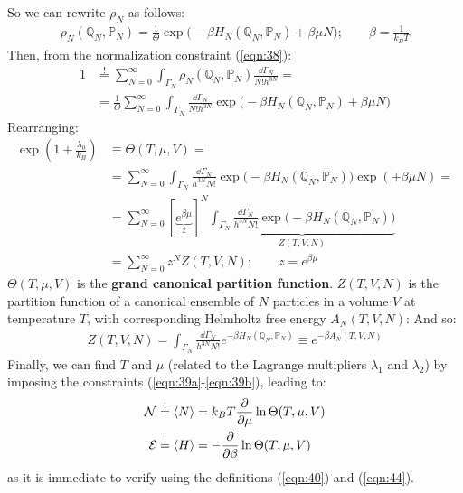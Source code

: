 \documentclass[../template.tex]{subfiles}
\begin{document}
So we can rewrite $\rho_N$ as follows:
\begin{align}\label{eqn:42}
    \rho_N(\mathbb{Q}_N, \mathbb{P}_N) = \frac{1}{\Theta} \exp \Big(-\beta H_N(\mathbb{Q}_N, \mathbb{P}_N) + \beta \mu N \Big); \qquad \beta = \frac{1}{k_B T} 
\end{align}
Then, from the normalization constraint (\ref{eqn:38}):
\begin{align*}
    1 &\overset{!}{=}  \sum_{N=0}^\infty \int_{\Gamma_N} \rho_N(\mathbb{Q}_N, \mathbb{P}_N) \frac{\dd{\Gamma_N}}{N! h^{3N}} =\\
    &= \frac{1}{\Theta} \sum_{N=0}^\infty \int_{\Gamma_N} \frac{\dd{\Gamma_N}}{N! h^{3N}} \exp \Big(-\beta H_N(\mathbb{Q}_N, \mathbb{P}_N) + \beta \mu N \Big)
\end{align*}
Rearranging:
\begin{align} \nonumber
    \exp\left(1+ \frac{\lambda_0}{k_B} \right) &\equiv \Theta(T, \mu, V) =\\ \nonumber
    &= \sum_{N=0}^\infty \int_{\Gamma_N} \frac{\dd{\Gamma_N}}{h^{3N}N!} \exp \Big(-\beta H_N(\mathbb{Q}_N, \mathbb{P}_N)\Big)\exp ( + \beta \mu N )=\\
    &= \sum_{N=0}^\infty [\underbrace{e^{\beta \mu}}_{z}]^N \underbrace{\int_{\Gamma_N} \frac{\dd{\Gamma_N}}{h^{3N} N!} \exp \Big( -\beta H_N(\mathbb{Q}_N, \mathbb{P}_N)\Big)}_{Z(T,V,N)} \\
    &=  \sum_{N=0}^\infty z^N Z(T,V,N); \qquad z=e^{\beta \mu} \label{eqn:44}
\end{align}
$\Theta(T,\mu,V)$ is the \textbf{grand canonical partition function}. $Z(T,V,N)$ is the partition function of a canonical ensemble of $N$ particles in a volume $V$ at temperature $T$, with corresponding Helmholtz free energy $A_N(T,V,N)$:
And so:
\begin{align}\label{eqn:46}
    Z(T,V,N) = \int_{\Gamma_N} \frac{\dd{\Gamma_N}}{h^{3N}N!} e^{-\beta H_N(\mathbb{Q}_N, \mathbb{P}_N)} \equiv e^{-\beta A_N(T, V, N)} 
\end{align}
Finally, we can find $T$ and $\mu$ (related to the Lagrange multipliers $\lambda_1$ and $\lambda_2$) by imposing the constraints (\ref{eqn:39a}-\ref{eqn:39b}), leading to:
\begin{align}\label{eqn:47}
    \mathcal{N} &\overset{!}{=}  \langle N \rangle = k_B T \pdv{\mu}\ln \Theta(T, \mu, V)\\
    \mathcal{E} &\overset{!}{=}  \langle H \rangle = - \pdv{\beta} \ln \Theta(T, \mu, V) \label{eqn:48}
\end{align}
as it is immediate to verify using the definitions (\ref{eqn:40}) and (\ref{eqn:44}).
\end{document}
